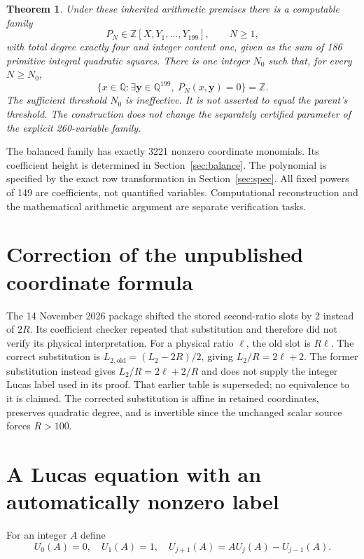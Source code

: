 \documentclass[11pt,a4paper]{article}
\newtheorem{theorem}{Theorem}[section]\newtheorem{lemma}[theorem]{Lemma}\newtheorem{proposition}[theorem]{Proposition}\newtheorem{corollary}[theorem]{Corollary}
\newcommand{\Q}{\mathbb Q}\newcommand{\Z}{\mathbb Z}\DeclareMathOperator{\Tr}{Tr}
\begin{document}
\begin{theorem}\label{thm:main}
Under these inherited arithmetic premises there is a computable family
\[
 P_N\in\Z[X,Y_1,\ldots,Y_{199}],\qquad N\ge1,
\]
with total degree exactly four and integer content one, given as the sum
of 186 primitive integral quadratic squares. There is one integer $N_0$
such that, for every $N\ge N_0$,
\[
 \{x\in\Q:\exists\boldsymbol y\in\Q^{199},\ P_N(x,\boldsymbol y)=0\}=\Z.
\]
The sufficient threshold $N_0$ is ineffective. It is not asserted to equal
the parent's threshold. The construction does not change the separately
certified parameter of the explicit 260-variable family.
\end{theorem}

The balanced family has exactly 3221 nonzero coordinate monomials. Its
coefficient height is determined in Section~\ref{sec:balance}.
The polynomial is specified by the exact row transformation in
Section~\ref{sec:spec}. All fixed powers of 149 are coefficients, not
quantified variables. Computational reconstruction and the mathematical
arithmetic argument are separate verification tasks.

\section{Correction of the unpublished coordinate formula}
The 14 November 2026 package shifted the stored second-ratio slots by
2 instead of $2R$. Its coefficient checker repeated that substitution
and therefore did not verify its physical interpretation. For a physical
ratio $\ell$, the old slot is $R\ell$. The correct substitution is
$L_{2,\mathrm{old}}=(L_2-2R)/2$, giving $L_2/R=2\ell+2$.
The former substitution instead gives $L_2/R=2\ell+2/R$ and does not
supply the integer Lucas label used in its proof. That earlier table is
superseded; no equivalence to it is claimed. The corrected substitution
is affine in retained coordinates, preserves quadratic degree, and is
invertible since the unchanged scalar source forces $R>100$.

\section{A Lucas equation with an automatically nonzero label}
For an integer $A$ define
\[
 U_0(A)=0,\quad U_1(A)=1,\quad U_{j+1}(A)=A U_j(A)-U_{j-1}(A).
\]
\end{document}
